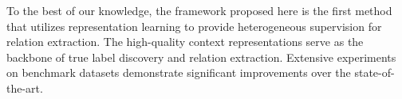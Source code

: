 


To the best of our knowledge, the framework proposed here is the first method that utilizes representation learning to provide heterogeneous supervision for relation extraction.
The high-quality context representations serve as the backbone of true label discovery and relation extraction. 
Extensive experiments on benchmark datasets demonstrate significant improvements over the state-of-the-art.

